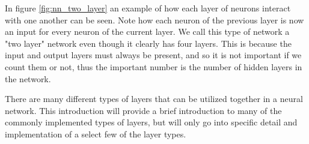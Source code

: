 \documentclass[10pt]{amsart}
\newenvironment{Figure}
{\par\medskip\noindent\minipage{\linewidth}}
{\endminipage\par\medskip}
\begin{document}
\begin{multicols}{2}
  \begin{Figure}
  \begin{center}
    
  \end{center}
  \label{fig:nn_two_layer}
  \end{Figure}

  In figure \ref{fig:nn_two_layer} an example of how each layer of neurons
  interact with one another can be seen. Note how each neuron of the previous
  layer is now an input for every neuron of the current layer. We call this
  type of network a "two layer" network even though it clearly has four layers.
  This is because the input and output layers must always be present, and so it
  is not important if we count them or not, thus the important number is the
  number of hidden layers in the network.

  There are many different types of layers that can be utilized together in a
  neural network. This introduction will provide a brief introduction to many
  of the commonly implemented types of layers, but will only go into specific
  detail and implementation of a select few of the layer types.


\end{multicols}
\end{document}
